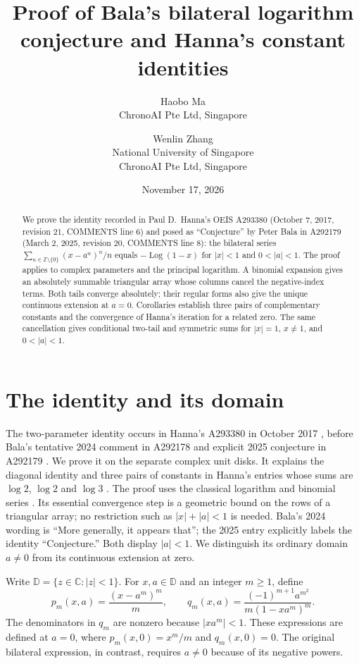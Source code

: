 \documentclass[11pt]{article}
\title{Proof of Bala's bilateral logarithm conjecture\newline
and Hanna's constant identities}
\author{Haobo Ma\\\small ChronoAI Pte Ltd, Singapore
\and Wenlin Zhang\\\small National University of Singapore\\
\small ChronoAI Pte Ltd, Singapore}
\date{November 17, 2026}
\DeclareMathOperator{\Log}{Log}
\begin{document}
\maketitle
\begin{abstract}
We prove the identity recorded in Paul D.\ Hanna's OEIS A293380
(October 7, 2017, revision 21, COMMENTS line 6) and posed as
``Conjecture'' by Peter Bala in A292179
(March 2, 2025, revision 20, COMMENTS line 8): the bilateral series
$\sum_{n\in\mathbb Z\setminus\{0\}}(x-a^n)^n/n$ equals
$-\Log(1-x)$ for $|x|<1$ and $0<|a|<1$.
The proof applies to complex parameters and the principal logarithm.
A binomial expansion gives an absolutely summable triangular array whose
columns cancel the negative-index terms. Both tails converge absolutely;
their regular forms also give the unique continuous extension at $a=0$.
Corollaries establish three pairs of complementary constants and the
convergence of Hanna's iteration for a related zero.
The same cancellation gives conditional two-tail and symmetric sums for
$|x|=1$, $x\ne1$, and $0<|a|<1$.
\end{abstract}

\section{The identity and its domain}
The two-parameter identity occurs in Hanna's A293380 in October 2017
\cite{hanna380}, before Bala's tentative 2024 comment in A292178 and
explicit 2025 conjecture in A292179 \cite{bala178,bala179}.
We prove it on the separate complex unit disks. It explains the diagonal
identity and three pairs of constants in Hanna's entries whose sums are
$\log2$, $\log2$ and $\log3$ \cite{bala178,bala179,hanna12,hanna34}.
The proof uses the classical logarithm and binomial series
\cite[\S4.6, equations (4.6.1) and (4.6.7)]{dlmf}.
Its essential convergence step is a geometric bound on the rows of a
triangular array; no restriction such as $|x|+|a|<1$ is needed.
Bala's 2024 wording is ``More generally, it appears that''; the 2025
entry explicitly labels the identity ``Conjecture.'' Both display
$|a|<1$. We distinguish its ordinary domain $a\ne0$ from its continuous
extension at zero.

Write $\mathbb D=\{z\in\mathbb C:|z|<1\}$. For $x,a\in\mathbb D$
and an integer $m\geq1$, define
\begin{equation}\label{eq:tails}
 p_m(x,a)=\frac{(x-a^m)^m}{m},\qquad
 q_m(x,a)=\frac{(-1)^{m+1}a^{m^2}}{m(1-xa^m)^m}.
\end{equation}
The denominators in $q_m$ are nonzero because $|xa^m|<1$.
These expressions are defined at $a=0$, where $p_m(x,0)=x^m/m$
and $q_m(x,0)=0$. The original bilateral expression, in contrast,
requires $a\ne0$ because of its negative powers.
\end{document}
